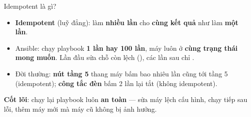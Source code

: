 \documentclass[aspectratio=169,11pt,xcolor=table]{beamer}
\begin{document}
\begin{frame}{Idempotent là gì?}
  \begin{itemize}\setlength{\itemsep}{0.25cm}
    \item \textbf{Idempotent} (luỹ đẳng): làm \textbf{nhiều lần} cho \textbf{cùng kết quả}
          như làm \textbf{một lần}.
    \item Ansible: chạy playbook \textbf{1 lần hay 100 lần}, máy luôn ở \textbf{cùng trạng thái mong muốn}.
          Lần đầu sửa chỗ còn lệch (), các lần sau chỉ .
    \item Đời thường: \textbf{nút tầng 5} thang máy bấm bao nhiêu lần cũng tới tầng 5 (idempotent);
          \textbf{công tắc đèn} bấm 2 lần lại tắt (không idempotent).
  \end{itemize}
  \vspace{0.25cm}
  \centering
  \par\vspace{0.25cm}
  \begin{fitnote}
    \textbf{Cốt lõi}: chạy lại playbook luôn \textbf{an toàn} — sửa máy lệch cấu hình,
    chạy tiếp sau lỗi, thêm máy mới mà máy cũ không bị ảnh hưởng.
  \end{fitnote}
\end{frame}
\end{document}
